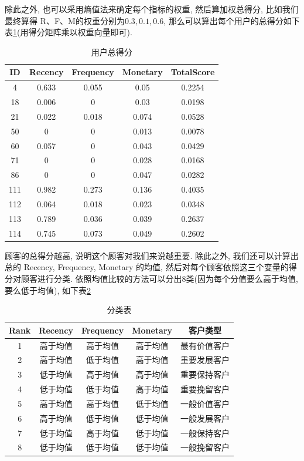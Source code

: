 \documentclass[a4paper,UTF8]{ctexart}
\theoremstyle{plain} \newtheorem{theorem}{定理}[section]
\theoremstyle{plain} \newtheorem{definition}{定义}[section]
\theoremstyle{plain} \newtheorem{lemma}{引理}[section]
\theoremstyle{plain} \newtheorem{proposition}{命题}[section]
\theoremstyle{plain} \newtheorem{example}{例}[section]
\theoremstyle{plain} \newtheorem{remark}{注}[section]
\theoremstyle{plain} \newtheorem{corollary}{推论}[section]
\begin{document}
除此之外, 也可以采用熵值法来确定每个指标的权重, 然后算加权总得分, 比如我们最终算得 R、F、M的权重分别为$0.3, 0.1, 0.6$, 那么可以算出每个用户的总得分如下表\ref{totalscale}(用得分矩阵乘以权重向量即可).
\begin{table}[!htb]
\centering
\caption{用户总得分}
\label{totalscale}
\begin{tabular}{ccccc}
	\hline
    \textbf{ID} & \textbf{Recency} & \textbf{Frequency} & \textbf{Monetary} & \textbf{TotalScore} \\
    \hline
	4 & 0.633 & 0.055 & 0.05 & 0.2254 \\ 
	\hline
	18 & 0.006 & 0 & 0.03 & 0.0198 \\ 
	\hline
	21 & 0.022 & 0.018 & 0.074 & 0.0528 \\ 
	\hline
	50 & 0 & 0 & 0.013 & 0.0078 \\ 
	\hline
	60 & 0.057 & 0 & 0.043 & 0.0429 \\ 
	\hline
	71 & 0 & 0 & 0.028 & 0.0168 \\ 
	\hline
	86 & 0 & 0 & 0.047 & 0.0282 \\ 
	\hline
	111 & 0.982 & 0.273 & 0.136 & 0.4035 \\ 
	\hline
	112 & 0.064 & 0.018 & 0.023 & 0.0348 \\ 
	\hline
	113 & 0.789 & 0.036 & 0.039 & 0.2637 \\ 
	\hline
	114 & 0.745 & 0.073 & 0.049 & 0.2602 \\ 
	\hline
\end{tabular}
\end{table}


顾客的总得分越高, 说明这个顾客对我们来说越重要. 除此之外, 我们还可以计算出总的 Recency, Frequency, Monetary 的均值, 然后对每个顾客依照这三个变量的得分对顾客进行分类. 依照均值比较的方法可以分出$8$类(因为每个分值要么高于均值, 要么低于均值), 如下表\ref{categ}
\begin{table}[!htb]
\centering
\caption{分类表}
\label{categ}
\begin{tabular}{ccccc}
	\hline
    \textbf{Rank} & \textbf{Recency} & \textbf{Frequency} & \textbf{Monetary} & \textbf{客户类型}  \\
    \hline
	1 & 高于均值 & 高于均值 & 高于均值 & 最有价值客户 \\ 
	\hline
	2 & 高于均值 & 低于均值 & 高于均值 & 重要发展客户 \\ 
	\hline
	3 & 低于均值 & 高于均值 & 高于均值 & 重要保持客户 \\ 
	\hline
	4 & 低于均值 & 低于均值 & 高于均值 & 重要挽留客户 \\ 
	\hline
	5 & 高于均值 & 高于均值 & 低于均值 & 一般价值客户 \\ 
	\hline
	6 & 高于均值 & 低于均值 & 低于均值 & 一般发展客户 \\ 
	\hline
	7 & 低于均值 & 高于均值 & 低于均值 & 一般保持客户 \\ 
	\hline
	8 & 低于均值 & 低于均值 & 低于均值 & 一般挽留客户 \\
	\hline
\end{tabular}
\end{table}
\end{document}
